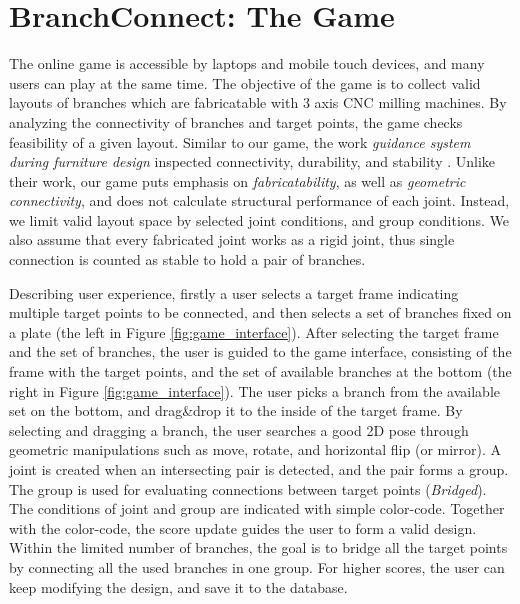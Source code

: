 \section{BranchConnect: The Game}
\label{sec:game}
The online game is accessible by laptops and mobile touch devices, and many users can play at the same time.
The objective of the game is to collect valid layouts of branches which are fabricatable with 3 axis CNC milling machines.
By analyzing the connectivity of branches and target points, the game checks feasibility of a given layout.
Similar to our game, the work \textit{guidance system during furniture design} inspected connectivity, durability, and stability \cite{umetani2012guided}.
Unlike their work, our game puts emphasis on \textit{fabricatability}, as well as \textit{geometric connectivity}, and does not calculate structural performance of each joint.
Instead, we limit valid layout space by selected joint conditions, and group conditions.
We also assume that every fabricated joint works as a rigid joint, thus single connection is counted as stable to hold a pair of branches.



Describing user experience, firstly a user selects a target frame indicating multiple target points to be connected, and then selects a set of branches fixed on a plate (the left in Figure \ref{fig:game_interface}).
After selecting the target frame and the set of branches, the user is guided to the game interface, consisting of the frame with the target points, and the set of available branches at the bottom (the right in Figure \ref{fig:game_interface}).
The user picks a branch from the available set on the bottom, and drag\&drop it to the inside of the target frame.
By selecting and dragging a branch, the user searches a good 2D pose through geometric manipulations such as move, rotate, and horizontal flip (or mirror).
A joint is created when an intersecting pair is detected, and the pair forms a group.
The group is used for evaluating connections between target points (\textit{Bridged}).
The conditions of joint and group are indicated with simple color-code.
Together with the color-code, the score update guides the user to form a valid design.
Within the limited number of branches, the goal is to bridge all the target points by connecting all the used branches in one group.
For higher scores, the user can keep modifying the design, and save it to the database.

